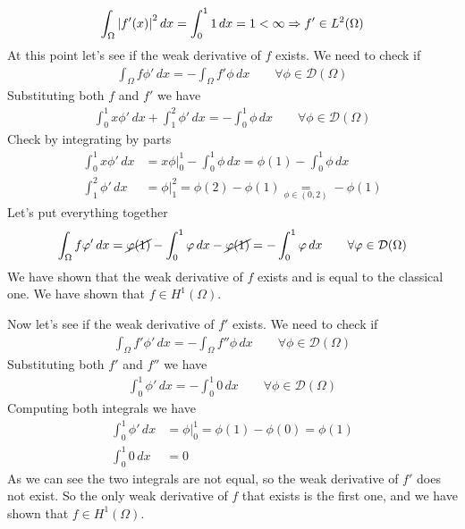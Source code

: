 \[
    \begin{split}
        \int_\Omega \abs{f'(x)}^2 \, dx = \int_0^1 1 \, dx = 1 < \infty \Rightarrow f' \in L^2(\Omega)
    \end{split}
\] 
At this point let's see if the weak derivative of \(f\) exists. We need to check if
\[
    \begin{split}
        \int_\Omega f \phi' \, dx = - \int_\Omega f' \phi \, dx \qquad \forall \phi \in \mathcal{D}(\Omega)
    \end{split}
\]
Substituting both \(f\) and \(f'\) we have
\[
    \begin{split}
        \int_0^1 x \phi' \, dx + \int_1^2 \phi' \, dx = - \int_0^1 \phi \, dx \qquad \forall \phi \in \mathcal{D}(\Omega)
    \end{split}
\]
Check by integrating by parts
\begin{align*}
    \int_0^1 x \phi' \, dx &= \left. x \phi \right|_0^1 - \int_0^1 \phi \, dx = \phi(1) - \int_0^1 \phi \, dx \\
    \int_1^2 \phi' \, dx &= \left. \phi \right|_1^2 = \phi(2) - \phi(1) \underset{\phi \in (0,2)}{=} - \phi(1)
\end{align*}
Let's put everything together
\[
    \begin{split}
        \int_\Omega f \phi' \, dx = \cancel{\phi(1)} - \int_0^1 \phi \, dx - \cancel{\phi(1)} = - \int_0^1 \phi \, dx \qquad \forall \phi \in \mathcal{D}(\Omega)
    \end{split}
\]
We have shown that the weak derivative of \(f\) exists and is equal to the classical one. We have shown that \(f \in H^1(\Omega)\).

Now let's see if the weak derivative of \(f'\) exists. We need to check if
\[
    \begin{split}
        \int_\Omega f' \phi' \, dx = - \int_\Omega f'' \phi \, dx \qquad \forall \phi \in \mathcal{D}(\Omega)
    \end{split}
\]
Substituting both \(f'\) and \(f''\) we have
\[
    \begin{split}
        \int_0^1 \phi' \, dx = - \int_0^1 0 \, dx \qquad \forall \phi \in \mathcal{D}(\Omega)
    \end{split}
\]
Computing both integrals we have
\begin{align*}
    \int_0^1 \phi' \, dx &= \left. \phi \right|_0^1 = \phi(1) - \phi(0) = \phi(1) \\
    \int_0^1 0 \, dx &= 0
\end{align*}
As we can see the two integrals are not equal, so the weak derivative of \(f'\) does not exist. So the only weak derivative of \(f\) that exists is the first one, and we have shown that \(f \in H^1(\Omega)\).

